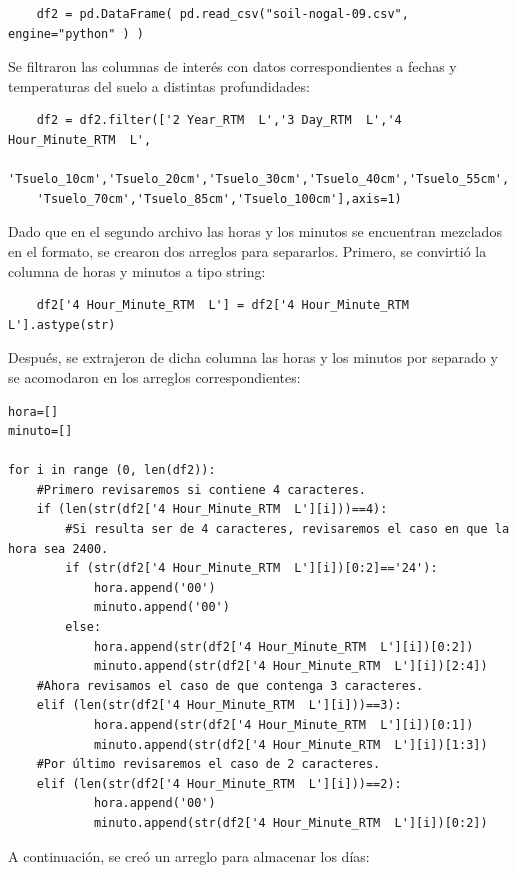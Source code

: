 \documentclass[letterpaper,12pt]{article}
\begin{document}
\begin{verbatim}
    df2 = pd.DataFrame( pd.read_csv("soil-nogal-09.csv", engine="python" ) )
\end{verbatim}

Se filtraron las columnas de interés con datos correspondientes a fechas y temperaturas del suelo a distintas profundidades:

\begin{verbatim}
    df2 = df2.filter(['2 Year_RTM  L','3 Day_RTM  L','4 Hour_Minute_RTM  L',
    'Tsuelo_10cm','Tsuelo_20cm','Tsuelo_30cm','Tsuelo_40cm','Tsuelo_55cm',
    'Tsuelo_70cm','Tsuelo_85cm','Tsuelo_100cm'],axis=1)
\end{verbatim}

Dado que en el segundo archivo las horas y los minutos se encuentran mezclados en el formato, se crearon dos arreglos para separarlos. Primero, se convirtió la columna de horas y minutos a tipo string:

\begin{verbatim}
    df2['4 Hour_Minute_RTM  L'] = df2['4 Hour_Minute_RTM  L'].astype(str)
\end{verbatim}

Después, se extrajeron de dicha columna las horas y los minutos por separado y se acomodaron en los arreglos correspondientes:

\begin{verbatim}
hora=[]
minuto=[]

for i in range (0, len(df2)):
    #Primero revisaremos si contiene 4 caracteres.
    if (len(str(df2['4 Hour_Minute_RTM  L'][i]))==4):
        #Si resulta ser de 4 caracteres, revisaremos el caso en que la hora sea 2400.
        if (str(df2['4 Hour_Minute_RTM  L'][i])[0:2]=='24'):
            hora.append('00')
            minuto.append('00')
        else:
            hora.append(str(df2['4 Hour_Minute_RTM  L'][i])[0:2])
            minuto.append(str(df2['4 Hour_Minute_RTM  L'][i])[2:4])
    #Ahora revisamos el caso de que contenga 3 caracteres.
    elif (len(str(df2['4 Hour_Minute_RTM  L'][i]))==3):
            hora.append(str(df2['4 Hour_Minute_RTM  L'][i])[0:1])
            minuto.append(str(df2['4 Hour_Minute_RTM  L'][i])[1:3])
    #Por último revisaremos el caso de 2 caracteres.
    elif (len(str(df2['4 Hour_Minute_RTM  L'][i]))==2):
            hora.append('00')
            minuto.append(str(df2['4 Hour_Minute_RTM  L'][i])[0:2])

\end{verbatim}

A continuación, se creó un arreglo para almacenar los días:
\end{document}
